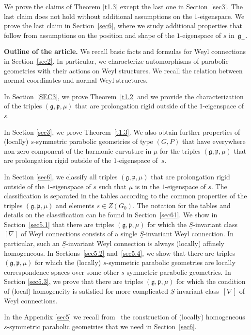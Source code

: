 \documentclass[10pt,a4paper]{amsart}
\newcommand{\un}{\underline}
\newcommand{\fg}{\mathfrak g}
\newcommand{\fp}{\mathfrak p}
\numberwithin{equation}{section}
\begin{document}
We prove the claims of Theorem \ref{t1.3} except the last one in Section~\ref{sec3}. The last claim does not hold without additional assumptions on the $1$-eigenspace. We prove the last claim in Section~\ref{sec6}, where we study additional properties that follow from assumptions on the position and shape of the $1$-eigenspace of $s$ in~$\fg_-$.

{\bf Outline of the article.} We recall basic facts and formulas for Weyl connections in Section~\ref{sec2}. In particular, we characterize automorphisms of parabolic geometries with their actions on Weyl structures. We recall the relation between normal coordinates and normal Weyl structures.

In Section~\ref{SEC3}, we prove Theorem~\ref{t1.2} and we provide the characterization of the triples $(\fg,\fp,\mu)$ that are prolongation rigid outside of the $1$-eigenspace of~$s$.

In Section \ref{sec3}, we prove Theorem~\ref{t1.3}. We also obtain further properties of (locally) $s$-symmetric parabolic geometries of type $(G,P)$ that have everywhere non-zero component of the harmonic curvature in $\mu$ for the triples $(\fg,\fp,\mu)$ that are prolongation rigid outside of the $1$-eigenspace of~$s$.

In Section \ref{sec6}, we classify all triples $(\fg,\fp,\mu)$ that are prolongation rigid outside of the $1$-eigenspace of $s$ such that $\mu$ is in the $1$-eigenspace of $s$. The classif\/ication is separated in the tables according to the common properties of the triples $(\fg,\fp,\mu)$ and elements $s\in Z(G_0)$. The notation for the tables and details on the classif\/ication can be found in Section~\ref{sec61}. We show in Section~\ref{sec5.1} that there are triples $(\fg,\fp,\mu)$ for which the $\un S$-invariant class $[\nabla]$ of Weyl connections consists of a single $\un S$-invariant Weyl connection. In particular, such an $\un S$-invariant Weyl connection is always (locally) af\/f\/inely homogeneous. In Sections~\ref{sec5.2} and~\ref{sec5.4}, we show that there are triples $(\fg,\fp,\mu)$ for which the (locally) $s$-symmetric parabolic geometries are locally correspondence spaces over some other $s$-symmetric parabolic geometries. In Section \ref{sec5.3}, we prove that there are triples $(\fg,\fp,\mu)$ for which the condition of (local) homogeneity is satisf\/ied for more complicated $\un S$-invariant class~$[\nabla]$ of Weyl connections.

In the Appendix \ref{sec5} we recall from~\cite{GZ2} the construction of (locally) homogeneous $s$-symmetric parabolic geometries that we need in Section~\ref{sec6}.
\end{document}
